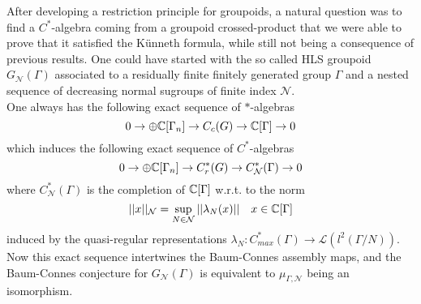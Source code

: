 After developing a restriction principle for groupoids, a natural question was to find a $C^*$-algebra coming from a groupoid crossed-product that we were able to prove that it satisfied the Künneth formula, while still not being a consequence of previous results. One could have started with the so called HLS groupoid $G_{\mathcal N}(\Gamma)$ associated to a residually finite finitely generated group $\Gamma$ and a nested sequence of decreasing  normal sugroups of finite index $\mathcal N$.\\

One always has the following exact sequence of $*$-algebras
\[ 0 \rightarrow \oplus \mathbb C[\Gamma_n] \rightarrow C_c(G) \rightarrow \mathbb C [\Gamma]  \rightarrow 0\]      
which induces the following exact sequence of $C^*$-algebras
\[ 0 \rightarrow \oplus \mathbb C[\Gamma_n] \rightarrow C_r^*(G) \rightarrow C^*_{\mathcal N} (\Gamma)  \rightarrow 0\]   
where $C^*_{\mathcal N}(\Gamma)$ is the completion of $\mathbb C[\Gamma]$ w.r.t. to the norm
\[||x||_{\mathcal N} = \sup_{N\in \mathcal N} ||\lambda_{N} (x)||\quad x\in \mathbb C[\Gamma] \]
induced by the quasi-regular representations $\lambda_{N} : C_{max}^*(\Gamma) \rightarrow \mathcal L(l^2(\Gamma/ N))$.  \\ 

Now this exact sequence intertwines the Baum-Connes assembly maps, and the Baum-Connes conjecture for $G_{\mathcal N}(\Gamma)$ is equivalent to $\mu_{\Gamma,\mathcal N}$ being an isomorphism. \\

